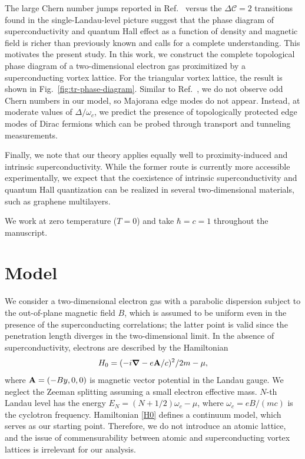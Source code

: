 \documentclass[10pt,prb,aps,superscriptaddress,amsmath,amssymb,twocolumn,floatfix,longbibliography]{revtex4-1}
\newcommand{\be}{\begin{equation} }
\newcommand{\ee}{\end{equation}}
\newcommand{\bA}{{\bf A}}
\begin{document}
The large Chern number jumps reported in Ref.~  versus the $\Delta \mathcal{C} = 2$ transitions found in the single-Landau-level picture suggest that the phase diagram of superconductivity and quantum Hall effect as a function of density and magnetic field is richer than previously known and calls for a complete understanding. This motivates the present study. 
In this work, we construct the complete topological phase diagram of a two-dimensional electron gas proximitized by a superconducting vortex lattice. For the triangular vortex lattice, the result is shown in Fig.~\ref{fig:tr-phase-diagram}. Similar to Ref.~, we do not observe odd Chern numbers in our model, so Majorana edge modes do not appear. Instead, at moderate values of $\Delta/\omega_c$, we predict 
the presence of topologically protected edge modes of
Dirac fermions which can be probed through transport and tunneling measurements.


Finally, we note that our theory applies equally well to proximity-induced and intrinsic superconductivity. While the former route is currently more accessible experimentally\cite{Manfra_InAs_MobilityExceeding}, we expect that the coexistence of intrinsic superconductivity and quantum Hall quantization can be realized in several two-dimensional materials, such as graphene multilayers\cite{ParkNature}.

We work at zero temperature ($T = 0$) and take $\hbar = c = 1$ throughout the manuscript. 


\section{Model}
\label{sec:model}


We consider a two-dimensional electron gas with a parabolic dispersion subject to the out-of-plane magnetic field $B$, which is assumed to be uniform even in the presence of the superconducting correlations; the latter point is valid since the penetration length diverges in the two-dimensional limit. In the absence of superconductivity, electrons are described by the Hamiltonian 
\be \label{H0}
H_0 = (-i\bm{\nabla} - e \bA/c)^2 / 2m - \mu,
\ee
where $\bA = (-By, 0, 0)$ is magnetic vector potential in the Landau gauge. We neglect the Zeeman splitting assuming a small electron effective mass. $N$-th Landau level has the energy $E_N = (N + 1 / 2) \omega_c - \mu$, where $\omega_c = e B / (m c)$ is the cyclotron frequency. Hamiltonian \eqref{H0} defines a continuum model, which serves as our starting point. Therefore, we do not introduce an atomic lattice, and the issue of commensurability between atomic and superconducting vortex lattices\cite{Hofstadter, Harper, Jain2022helical, Shaffer-HofstadterSC} is irrelevant for our analysis.
\end{document}
